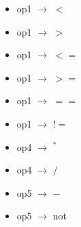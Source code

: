 \documentclass[11pt]{article}
\begin{document}
\begin{itemize}
                \item op1 $\rightarrow$ $<$
                \item op1 $\rightarrow$ $>$
                \item op1 $\rightarrow$ $<=$
                \item op1 $\rightarrow$ $>=$
                \item op1 $\rightarrow$ $==$
                \item op1 $\rightarrow$ $!=$
                \item op4 $\rightarrow$ $^{\ast}$
                \item op4 $\rightarrow$ $/$
                \item op5 $\rightarrow$ $-$
                \item op5 $\rightarrow$ not
            \end{itemize}
\end{document}
